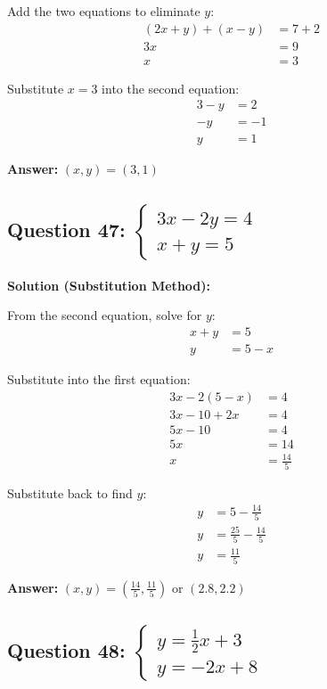 \documentclass[12pt]{article}
\begin{document}
Add the two equations to eliminate $y$:
\begin{align*}
(2x + y) + (x - y) &= 7 + 2 \\
3x &= 9 \\
x &= 3
\end{align*}

Substitute $x = 3$ into the second equation:
\begin{align*}
3 - y &= 2 \\
-y &= -1 \\
y &= 1
\end{align*}

\textbf{Answer: } $(x, y) = (3, 1)$

\vspace{0.3cm}

\subsection*{Question 47: $\begin{cases} 3x - 2y = 4 \\ x + y = 5 \end{cases}$}

\noindent\textbf{Solution (Substitution Method):}

From the second equation, solve for $y$:
\begin{align*}
x + y &= 5 \\
y &= 5 - x
\end{align*}

Substitute into the first equation:
\begin{align*}
3x - 2(5 - x) &= 4 \\
3x - 10 + 2x &= 4 \\
5x - 10 &= 4 \\
5x &= 14 \\
x &= \frac{14}{5}
\end{align*}

Substitute back to find $y$:
\begin{align*}
y &= 5 - \frac{14}{5} \\
y &= \frac{25}{5} - \frac{14}{5} \\
y &= \frac{11}{5}
\end{align*}

\textbf{Answer: } $(x, y) = \left(\frac{14}{5}, \frac{11}{5}\right)$ or $(2.8, 2.2)$

\vspace{0.3cm}

\subsection*{Question 48: $\begin{cases} y = \frac{1}{2}x + 3 \\ y = -2x + 8 \end{cases}$}
\end{document}
